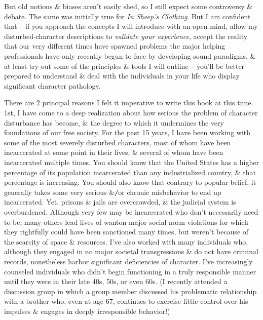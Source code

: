 \documentclass{article}
\numberwithin{equation}{section}
\begin{document}
But old notions \& biases aren't easily shed, so I still expect some controversy \& debate. The same was initially true for \textit{In Sheep's Clothing}. But I am confident that -- if you approach the concepts I will introduce with an open mind, allow my disturbed-character descriptions to \textit{validate your experience}, accept the reality that our very different times have spawned problems the major helping professionals have only recently begun to face by developing sound paradigms, \& at least try out some of the principles \& tools I will outline -- you'll be better prepared to understand \& deal with the individuals in your life who display significant character pathology.

There are 2 principal reasons I felt it imperative to write this book at this time. 1st, I have come to a deep realization about how serious the problem of character disturbance has become, \& the degree to which it undermines the very foundations of our free society. For the past 15 years, I have been working with some of the most severely disturbed characters, most of whom have been incarcerated at some point in their lives, \& several of whom have been incarcerated multiple times. You should know that the United States has a higher percentage of its population incarcerated than any industrialized country, \& that percentage is increasing. You should also know that contrary to popular belief, it generally takes some very serious \&\texttt{/}or chronic misbehavior to end up incarcerated. Yet, prisons \& jails are overcrowded, \& the judicial system is overburdened. Although very few may be incarcerated who don't necessarily need to be, many others lead lives of wanton major social norm violations for which they rightfully could have been sanctioned many times, but weren't because of the scarcity of space \& resources. I've also worked with many individuals who, although they engaged in no major societal transgressions \& do not have criminal records, nonetheless harbor significant deficiencies of character. I've increasingly counseled individuals who didn't begin functioning in a truly responsible manner until they were in their late 40s, 50s, or even 60s. (I recently attended a discussion group in which a group member discussed his problematic relationship with a brother who, even at age 67, continues to exercise little control over his impulses \& engages in deeply irresponsible behavior!)
\end{document}
